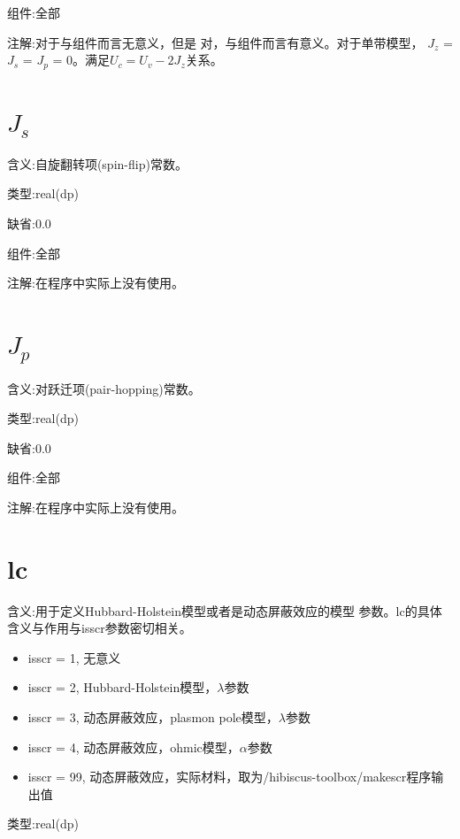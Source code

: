 {\color{brown}组件}:全部

{\color{purple}注解}:对于{\begonia}与{\lavender}组件而言无意义，但是
对{\azalea}，{\gardenia}与{\narcissus}组件而言有意义。对于单带模型，
$J_{z}$ = $J_{s}$ = $J_{p}$ = 0。满足$U_{c} = U_{v} - 2J_{z}$关系。

\section{$J_{s}$    }
\label{sec:Js}

{\color{red}含义}:自旋翻转项(spin-flip)常数。

{\color{green}类型}:real(dp)

{\color{blue}缺省}:0.0

{\color{brown}组件}:全部

{\color{purple}注解}:在程序中实际上没有使用。

\section{$J_{p}$    }
\label{sec:Jp}

{\color{red}含义}:对跃迁项(pair-hopping)常数。

{\color{green}类型}:real(dp)

{\color{blue}缺省}:0.0

{\color{brown}组件}:全部

{\color{purple}注解}:在程序中实际上没有使用。

\section{lc    }
\label{sec:lc}

{\color{red}含义}:用于定义Hubbard-Holstein模型或者是动态屏蔽效应的模型
参数。lc的具体含义与作用与isscr参数密切相关。

\begin{itemize}
\item isscr = 1, 无意义
\item isscr = 2, Hubbard-Holstein模型，$\lambda$参数
\item isscr = 3, 动态屏蔽效应，plasmon pole模型，$\lambda$参数
\item isscr = 4, 动态屏蔽效应，ohmic模型，$\alpha$参数
\item isscr = 99, 动态屏蔽效应，实际材料，取为{\hibiscus}/hibiscus-toolbox/makescr程序输出值
\end{itemize}

{\color{green}类型}:real(dp)

